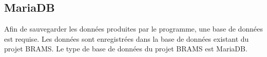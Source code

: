 \documentclass[11pt]{article}
\begin{document}

\subsection{MariaDB}

Afin de sauvegarder les données produites par le programme, une base de données est requise.
Les données sont enregistrées dans la base de données existant du projet BRAMS.
Le type de base de données du projet BRAMS est MariaDB.

\newpage
\end{document}
